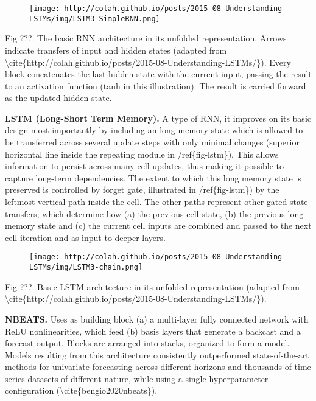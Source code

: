 \documentclass[
]{article}
\begin{document}
\begin{figure}
\centering
\texttt{[image: http://colah.github.io/posts/2015-08-Understanding-LSTMs/img/LSTM3-SimpleRNN.png]}
\caption{}
\end{figure}

Fig ???. The basic RNN architecture in its unfolded representation.
Arrows indicate transfers of input and hidden states (adapted from
\textbackslash cite\{http://colah.github.io/posts/2015-08-Understanding-LSTMs/\}).
Every block concatenates the last hidden state with the current input,
passing the result to an activation function (tanh in this
illustration). The result is carried forward as the updated hidden
state.

\textbf{LSTM (Long-Short Term Memory).} A type of RNN, it improves on
its basic design most importantly by including an long memory state
which is allowed to be transferred across several update steps with only
minimal changes (superior horizontal line inside the repeating module in
/ref\{fig-lstm\}). This allows information to persist across many cell
updates, thus making it possible to capture long-term dependencies. The
extent to which this long memory state is preserved is controlled by
forget gate, illustrated in /ref\{fig-lstm\}) by the leftmost vertical
path inside the cell. The other paths represent other gated state
transfers, which determine how (a) the previous cell state, (b) the
previous long memory state and (c) the current cell inputs are combined
and passed to the next cell iteration and as input to deeper layers.

\begin{figure}
\centering
\texttt{[image: http://colah.github.io/posts/2015-08-Understanding-LSTMs/img/LSTM3-chain.png]}
\caption{}
\end{figure}

Fig ???. Basic LSTM architecture in its unfolded representation (adapted
from
\textbackslash cite\{http://colah.github.io/posts/2015-08-Understanding-LSTMs/\}).

\textbf{NBEATS.} Uses as building block (a) a multi-layer fully
connected network with ReLU nonlinearities, which feed (b) basis layers
that generate a backcast and a forecast output. Blocks are arranged into
stacks, organized to form a model. Models resulting from this
architecture consistently outperformed state-of-the-art methods for
univariate forecasting across different horizons and thousands of time
series datasets of different nature, while using a single hyperparameter
configuration (\textbackslash cite\{bengio2020nbeats\}).
\end{document}
